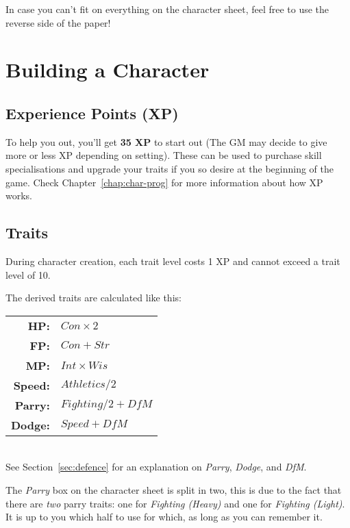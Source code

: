 \begin{note} 
    In case you can't fit on everything on the character sheet, feel free to use the reverse side of the paper!
\end{note}

\section{Building a Character}
\subsection{Experience Points (XP)}
To help you out, you'll get \textbf{35 XP} to start out (The GM may decide to give more or less XP depending on setting).
These can be used to purchase skill specialisations and upgrade your traits if you so desire at the beginning of the game.
Check Chapter~\ref{chap:char-prog} for more information about how XP works.

\subsection{Traits}
During character creation, each trait level costs 1 XP and cannot exceed a trait level of 10.

The derived traits are calculated like this:

\begin{tabular} {r | l} 
\textbf{HP:} & $Con \times 2$ \\
\textbf{FP:} & $Con + Str$ \\
\textbf{MP:} & $Int \times Wis$ \\
\textbf{Speed:} & $Athletics / 2$\\
\textbf{Parry:} & $Fighting / 2 + \mathit{DfM}$\\
\textbf{Dodge:} & $Speed + \mathit{DfM}$ \\
\end{tabular}\\
See Section~\ref{sec:defence} for an explanation on \textit{Parry}, \textit{Dodge}, and \textit{DfM}.

\begin{note} 
    The \textit{Parry} box on the character sheet is split in two, this is due to the fact that there are \textit{two} parry traits: one for \textit{Fighting (Heavy)} and one for \textit{Fighting (Light)}.
    It is up to you which half to use for which, as long as you can remember it.
\end{note}

